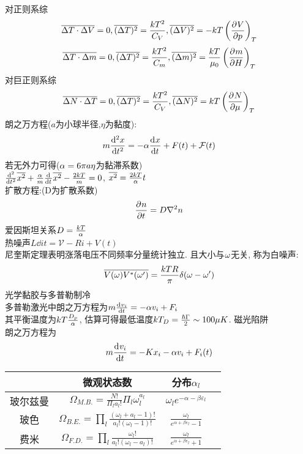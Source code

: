 \documentclass[UTF8,8pt]{ctexart}
\begin{document}
\begin{multicols}{3}
对正则系综
$$\bar{\D T\cdot\D V}=0,\bar{(\D T)^2}=\f{kT^2}{C_V},\bar{(\D V)^2}=-kT\of{\pp{V}{p}}_T$$
$$\bar{\D T\cdot\D m}=0,\bar{(\D T)^2}=\f{kT^2}{C_m},\bar{(\D m)^2}=\f{kT}{\mu_0}\of{\pp{m}{H}}_T$$
对巨正则系综
$$\bar{\D N\cdot\D T}=0,\bar{(\D T)^2}=\f{kT^2}{C_V},\bar{(\D N)^2}=kT\of{\pp{N}{\mu}}_T$$
朗之万方程($a$为小球半径,$\eta$为黏度):
$$m\dt[2]x=-\a\dt{x}+F(t)+\mathcal{F}(t)$$
若无外力可得($\a=6\pi a\eta$为黏滞系数)\\
$\dt[2]{}\bar{x^2}+\f{\a}{m}\dt{}\bar{x^2}-\f{2kT}{m}=0$, 
$\bar{x^2}=\f{2kT}{\a}t$\\
扩散方程:(D为扩散系数)
$$\pp{n}{t}=D\nabla^2n$$
爱因斯坦关系$D=\f{kT}{\a}$\\
热噪声$L\dd{i}{t}=\mathcal{V}-Ri+V(t)$\\
尼奎斯定理表明涨落电压不同频率分量统计独立. 且大小与$\o$无关, 称为白噪声:
$$\bar{V(\o)V^*(\o')}=\f{kTR}{\pi}\de(\o-\o')$$
光学黏胶与多普勒制冷\\
多普勒激光中朗之万方程为$m\dd{v_i}{t}=-\a v_i+F_i$\\
其平衡温度为$kT\f{D_p}{\a}$, 估算可得最低温度$kT_D=\f{\hbar\Gamma}{2}\sim100\mu K$. 
磁光陷阱\\
朗之万方程为
$$m\dt{v_i}=-Kx_i-\a v_i+F_i(t)$$ 
\begin{tabular}{|c|c|c|c|}
    \hline
                 & 微观状态数                                                                                                & 分布$\alpha_{l}$                                                                                                   \\ \hline
    玻尔兹曼 & $\Omega_{M . B .}=\frac{N !}{\Pi_{l} a_{l} !} \Pi_{l} \omega_{l}^{a_{l}}$                                 & $\omega_{l} e^{-\alpha-\beta \varepsilon_{l}}$                    \\ \hline
    玻色     & $\Omega_{B . E .}=\prod_{l} \frac{\left(\omega_{l}+a_{l}-1\right) !}{a_{l} !\left(\omega_{l}-1\right) !}$ & $\frac{\omega_{l}}{e^{\alpha+\beta \varepsilon_{l}}-1}$  \\ \hline
    费米     & $\Omega_{F . D .}=\prod_{l} \frac{\omega_{l} !}{a_l!\left(\omega_{l}-a_{l}\right) !}$                     & $\frac{\omega_{l}}{e^{\alpha+\beta \varepsilon_{l}}+1}$ \\ \hline
\end{tabular}
\end{multicols}
\end{document}
